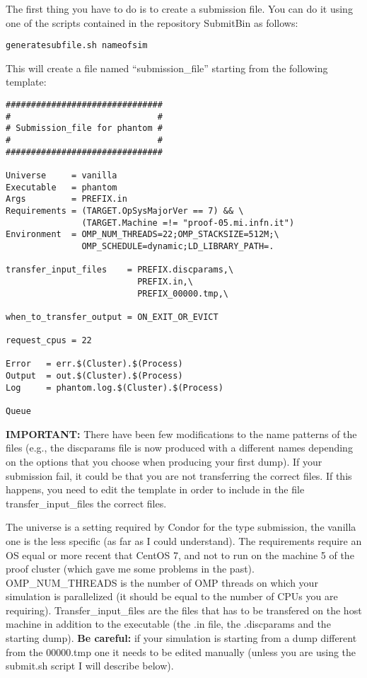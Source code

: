 \documentclass[10pt,a4paper,twoside]{article} %
\begin{document}
The first thing you have to do is to create a submission file. You can do it using one of the scripts contained in the repository SubmitBin as follows:
\begin{verbatim}
generatesubfile.sh nameofsim
\end{verbatim}
This will create a file named ``submission\_file'' starting from the following template:
\begin{verbatim}
###############################
#                             #
# Submission_file for phantom #
#                             #
###############################

Universe     = vanilla
Executable   = phantom
Args         = PREFIX.in
Requirements = (TARGET.OpSysMajorVer == 7) && \
               (TARGET.Machine =!= "proof-05.mi.infn.it")
Environment  = OMP_NUM_THREADS=22;OMP_STACKSIZE=512M;\
               OMP_SCHEDULE=dynamic;LD_LIBRARY_PATH=.

transfer_input_files    = PREFIX.discparams,\
                          PREFIX.in,\
                          PREFIX_00000.tmp,\

when_to_transfer_output = ON_EXIT_OR_EVICT

request_cpus = 22

Error   = err.$(Cluster).$(Process)
Output  = out.$(Cluster).$(Process)
Log     = phantom.log.$(Cluster).$(Process)

Queue
\end{verbatim}
\textbf{IMPORTANT:} There have been few modifications to the name patterns of the files (e.g., the discparams file is now produced with a different names depending on the options that you choose when producing your first dump). If your submission fail, it could be that you are not transferring the correct files. If this happens, you need to edit the template in order to include in the file transfer\_input\_files the correct files.

The universe is a setting required by Condor for the type submission, the vanilla one is the less specific (as far as I could understand). The requirements require an OS equal or more recent that CentOS 7, and not to run on the machine 5 of the proof cluster (which gave me some problems in the past). OMP\_NUM\_THREADS is the number of OMP threads on which your simulation is parallelized (it should be equal to the number of CPUs you are requiring). Transfer\_input\_files are the files that has to be transfered on the host machine in addition to the executable (the .in file, the .discparams and the starting dump). \textbf{Be careful:} if your simulation is starting from a dump different from the 00000.tmp one it needs to be edited manually (unless you are using the submit.sh script I will describe below).
\end{document}
